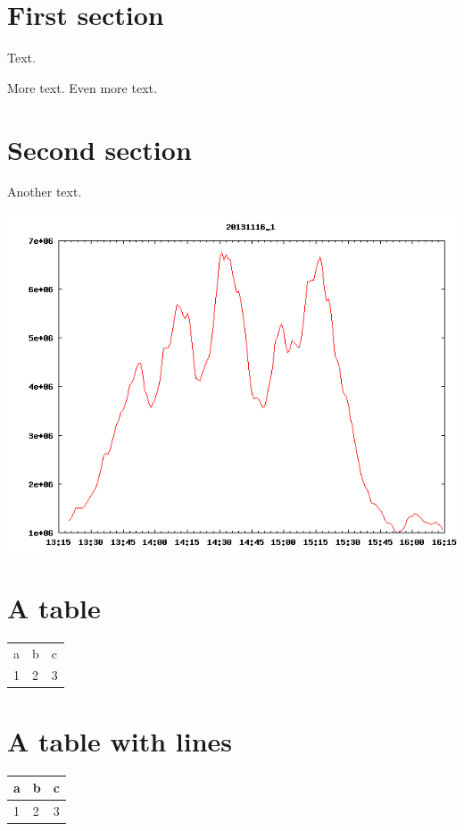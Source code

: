 \documentclass[a4paper,twoside,11pt]{article}
\begin{document}
\section{First section}

Text.

More text.
Even more text.

\section{Second section}

Another text.

\includegraphics[width=\textwidth]{chart}

\section{A table}

\begin{tabular}{lll}
  a & b & c \\
  1 & 2 & 3 \\
\end{tabular}

\section{A table with lines}

\begin{tabular}{|l|l|l|}
  \hline
  a & b & c \\
  \hline
  1 & 2 & 3 \\
  \hline
\end{tabular}
\end{document}
